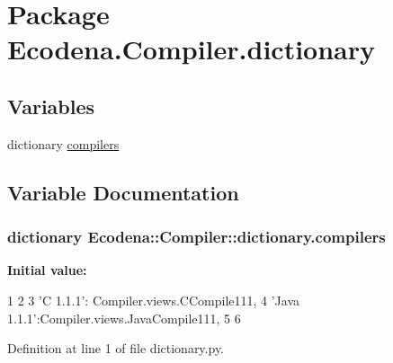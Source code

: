 \hypertarget{namespace_ecodena_1_1_compiler_1_1dictionary}{
\section{Package Ecodena.Compiler.dictionary}
\label{d4/d2e/namespace_ecodena_1_1_compiler_1_1dictionary}
}
\subsection*{Variables}
\begin{DoxyCompactItemize}
\item 
dictionary \hyperlink{namespace_ecodena_1_1_compiler_1_1dictionary_af63ec36157fc96237bdb5926dda5a77f}{compilers}
\end{DoxyCompactItemize}


\subsection{Variable Documentation}
\hypertarget{namespace_ecodena_1_1_compiler_1_1dictionary_af63ec36157fc96237bdb5926dda5a77f}{
\subsubsection[{compilers}]{\setlength{\rightskip}{0pt plus 5cm}dictionary {\bf Ecodena::Compiler::dictionary.compilers}}}
\label{d4/d2e/namespace_ecodena_1_1_compiler_1_1dictionary_af63ec36157fc96237bdb5926dda5a77f}
{\bfseries Initial value:}
\begin{DoxyCode}
1 {
2 
3 'C 1.1.1': Compiler.views.CCompile111,
4 'Java 1.1.1':Compiler.views.JavaCompile111,
5 
6 }
\end{DoxyCode}


Definition at line 1 of file dictionary.py.

